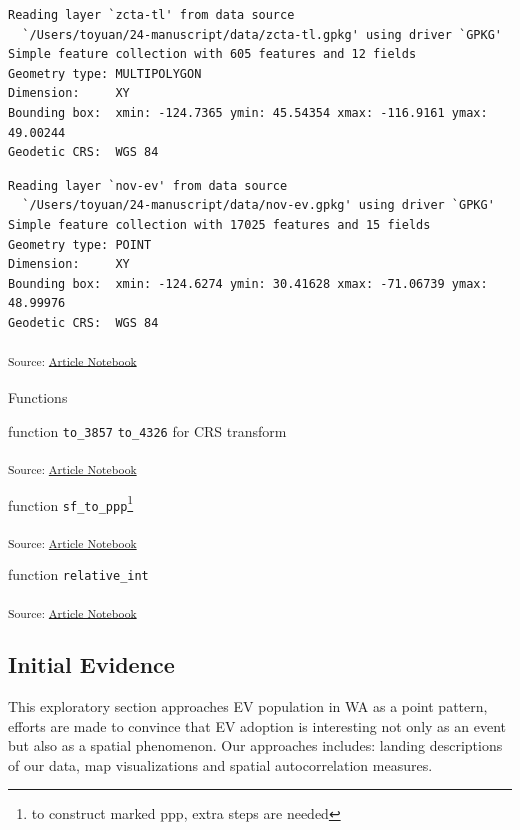\documentclass[
  letterpaper,
  DIV=11,
  numbers=noendperiod]{scrartcl}
\makeatletter
\let\oldparagraph\paragraph
\renewcommand{\paragraph}{
    \@ifstar
      \xxxParagraphStar
      \xxxParagraphNoStar
  }
\newcommand{\xxxParagraphStar}[1]{\oldparagraph*{#1}\mbox{}}
\newcommand{\xxxParagraphNoStar}[1]{\oldparagraph{#1}\mbox{}}
\makeatother
\begin{document}
\begin{verbatim}
Reading layer `zcta-tl' from data source 
  `/Users/toyuan/24-manuscript/data/zcta-tl.gpkg' using driver `GPKG'
Simple feature collection with 605 features and 12 fields
Geometry type: MULTIPOLYGON
Dimension:     XY
Bounding box:  xmin: -124.7365 ymin: 45.54354 xmax: -116.9161 ymax: 49.00244
Geodetic CRS:  WGS 84
\end{verbatim}

\begin{verbatim}
Reading layer `nov-ev' from data source 
  `/Users/toyuan/24-manuscript/data/nov-ev.gpkg' using driver `GPKG'
Simple feature collection with 17025 features and 15 fields
Geometry type: POINT
Dimension:     XY
Bounding box:  xmin: -124.6274 ymin: 30.41628 xmax: -71.06739 ymax: 48.99976
Geodetic CRS:  WGS 84
\end{verbatim}

\textsubscript{Source:
\href{https://h-christy.github.io/24-manuscript/index.qmd.html}{Article
Notebook}}

\paragraph{Functions}\label{functions}

function \texttt{to\_3857} \texttt{to\_4326} for CRS transform

\textsubscript{Source:
\href{https://h-christy.github.io/24-manuscript/index.qmd.html}{Article
Notebook}}

function \texttt{sf\_to\_ppp}\footnote{to construct marked ppp, extra
  steps are needed}

\textsubscript{Source:
\href{https://h-christy.github.io/24-manuscript/index.qmd.html}{Article
Notebook}}

function \texttt{relative\_int}

\textsubscript{Source:
\href{https://h-christy.github.io/24-manuscript/index.qmd.html}{Article
Notebook}}

\subsection{Initial Evidence}\label{initial-evidence}

This exploratory section approaches EV population in WA as a point
pattern, efforts are made to convince that EV adoption is interesting
not only as an event but also as a spatial phenomenon. Our approaches
includes: landing descriptions of our data, map visualizations and
spatial autocorrelation measures.
\end{document}
